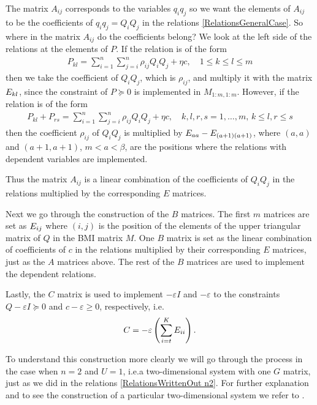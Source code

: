 \documentclass[a4paper,12pt,twoside,BCOR=10mm]{scrbook}
\begin{document}
The matrix $A_{ij}$ corresponds to the variables $q_iq_j$ so we want the elements of $A_{ij}$ to be the coefficients of $q_iq_j = Q_iQ_j$ in the relations \eqref{RelationsGeneralCase}. So where in the matrix $A_{ij}$ do the coefficients belong? We look at the left side of the relations at the elements of $P$. If the relation is of the form
\begin{align*}
    P_{kl} = \sum_{i = 1}^n\sum_{j = i}^n \rho_{ij}Q_iQ_j + \eta c, \quad 1 \leq k \leq l \leq m
\end{align*}
then we take the coefficient of $Q_iQ_j$, which is $\rho_{ij}$, and multiply it with the matrix $E_{kl}$, since the constraint of $P \succeq 0$ is implemented in $M_{1:m, 1:m}$. However, if the relation is of the form
\begin{align*}
    P_{kl} + P_{rs} = \sum_{i = 1}^n\sum_{j = i}^n \rho_{ij}Q_iQ_j + \eta c, \quad k,l,r,s = 1, \ldots, m, \, k \leq l, r\leq s
\end{align*}
then the coefficient $\rho_{ij}$ of $Q_i Q_j$ is multiplied by $E_{aa} - E_{(a+1)(a+1)}$, where $(a,a)$ and $(a+1,a+1)$, $m < a < \beta$, are the positions where the relations with dependent variables are implemented.

Thus the matrix $A_{ij}$ is a linear combination of the coefficients of $Q_iQ_j$ in the relations multiplied by the corresponding $E$ matrices.

Next we go through the construction of the $B$ matrices. The first $m$ matrices are set as $E_{ij}$ where $(i,j)$ is the position of the elements of the upper triangular matrix of $Q$ in the BMI matrix $M$. One $B$ matrix is set as the linear combination of coefficients of $c$ in the relations multiplied by their corresponding $E$ matrices, just as the $A$ matrices above. The rest of the $B$ matrices are used to implement the dependent relations.

Lastly, the $C$ matrix is used to implement $-\varepsilon I$ and $-\varepsilon$ to the constraints $Q - \varepsilon I \succeq 0$ and $c - \varepsilon \geq 0$, respectively, i.e.
\begin{align*}
    C = -\varepsilon\left(\sum_{i = t}^K E_{ii}\right).
\end{align*}

To understand this construction more clearly we will go through the process in the case when $n = 2$ and $U = 1$, i.e.\@ a two-dimensional system with one $G$ matrix, just as we did in the relations \eqref{RelationsWrittenOut n2}. For further explanation and to see the construction of a particular two-dimensional system we refer to \citep{Ha2019BMI}.
\end{document}
